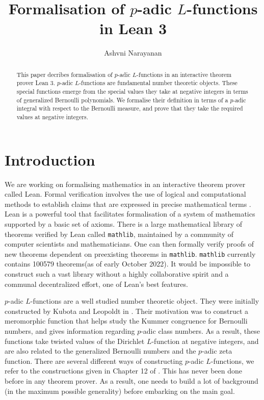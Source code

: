 \documentclass[a4paper,UKenglish,cleveref, autoref, thm-restate]{lipics-v2021}
\title{Formalisation of $p$-adic $L$-functions in Lean 3} %
\author{Ashvni Narayanan}{London School of Geometry and Number Theory, Imperial College London}{a.narayanan20@imperial.ac.uk}{https://orcid.org/0000-0003-2777-4228}{EPSRC Grant EP/S021590/1 (UK)}%
\newcommand{\lean}[1]{\texttt{#1}\xspace} %
\begin{document}
\maketitle

\begin{abstract}
This paper decribes formalisation of $p$-adic $L$-functions in an interactive theorem prover Lean 3. $p$-adic 
$L$-functions are fundamental number theoretic objects. These special functions emerge from the special 
values they take at negative integers in terms of generalized Bernoulli polynomials. We formalise their 
definition in terms of a $p$-adic integral with respect to the Bernoulli measure, and prove that they 
take the required values at negative integers.
\end{abstract}

\section{Introduction}
We are working on formalising mathematics in an interactive theorem prover called Lean. 
Formal verification involves the use of logical and computational methods to establish 
claims that are expressed in precise mathematical terms \cite{TPIL}. Lean is a powerful tool 
that facilitates formalisation of a system of mathematics supported by a basic set of axioms. There is a large mathematical library of theorems verified by Lean called \lean{mathlib}, maintained by a community of computer scientists and mathematicians. One can then 
formally verify proofs of new theorems dependent on preexisting theorems in \lean{mathlib}. 
\lean{mathlib} currently contains 100579 theorems(as of early October 2022). It would be impossible to construct 
such a vast library without a highly collaborative spirit and a communal decentralized effort, one of 
Lean's best features. 

$p$-adic $L$-functions are a well studied number theoretic object. They were initially constructed 
by Kubota and Leopoldt in \cite{KL}. Their motivation was to construct a meromorphic function that helps study 
the Kummer congruence for Bernoulli numbers, and gives information regarding $p$-adic class numbers. 
As a result, these functions take twisted values of the Dirichlet $L$-function at negative integers, and 
are also related to the generalized Bernoulli numbers and the $p$-adic zeta function. There are several different ways of 
constructing $p$-adic $L$-functions, we refer to the constructions
given in Chapter 12 of \cite{cyc}. This has never been done before in any 
theorem prover. As a result, one needs to build a lot of background (in the maximum possible generality) 
before embarking on the main goal.
\end{document}
